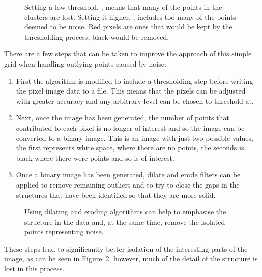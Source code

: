 \begin{figure}[tbh]
	\caption[Effect of threshold value on clusters identified.]{Setting a low
		threshold, , means that many of the
		points in the clusters are lost. Setting it higher,
		, includes too many of the points
		deemed to be noise. Red pixels are ones that would be kept by the
		thresholding process, black would be removed.}\label{fig:grid-noise}
\end{figure}

There are a few steps that can be taken to improve the approach of this simple
grid when handling outlying points caused by noise:

\begin{enumerate}

	\item First the algorithm is modified to include a thresholding step before
		writing the pixel image data to a file. This means that the pixels can
		be adjusted with greater accuracy and any arbitrary level can be chosen
		to threshold at.

	\item Next, once the image has been generated, the number of points that
		contributed to each pixel is no longer of interest and so the image can
		be converted to a binary image. This is an image with just two possible
		values, the first represents white space, where there are no points,
		the seconds is black where there were points and so is of interest.

	\item Once a binary image has been generated, dilate and erode filters can
		be applied to remove remaining outliers and to try to close the gaps in
		the structures that have been identified so that they are more solid.

\end{enumerate}

\begin{figure}[tbh]
	\centering

	\caption[Closing algorithm to identify clusters.]{Using dilating and
		eroding algorithms can help to emphasise the structure in the
		data and, at the same time, remove the isolated points representing
		noise.}\label{fig:grid-threshold-close}
\end{figure}

These steps lead to significantly better isolation of the interesting parts of
the image, as can be seen in Figure~\ref{fig:grid-threshold-close}, however,
much of the detail of the structure is lost in this process.
